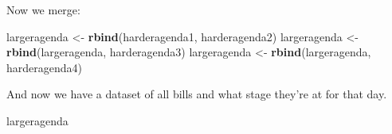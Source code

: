 \documentclass[]{book}
\newenvironment{Shaded}{\begin{snugshade}}{\end{snugshade}}
\newcommand{\CharTok}[1]{\textcolor[rgb]{0.31,0.60,0.02}{#1}}
\newcommand{\DataTypeTok}[1]{\textcolor[rgb]{0.13,0.29,0.53}{#1}}
\newcommand{\DecValTok}[1]{\textcolor[rgb]{0.00,0.00,0.81}{#1}}
\newcommand{\KeywordTok}[1]{\textcolor[rgb]{0.13,0.29,0.53}{\textbf{#1}}}
\newcommand{\NormalTok}[1]{#1}
\newcommand{\OperatorTok}[1]{\textcolor[rgb]{0.81,0.36,0.00}{\textbf{#1}}}
\newcommand{\StringTok}[1]{\textcolor[rgb]{0.31,0.60,0.02}{#1}}
\begin{document}
\begin{Shaded}
\end{Shaded}

Now we merge:

\begin{Shaded}
\begin{Highlighting}[]
\NormalTok{largeragenda <-}\StringTok{ }\KeywordTok{rbind}\NormalTok{(harderagenda1, harderagenda2)}
\NormalTok{largeragenda <-}\StringTok{ }\KeywordTok{rbind}\NormalTok{(largeragenda, harderagenda3)}
\NormalTok{largeragenda <-}\StringTok{ }\KeywordTok{rbind}\NormalTok{(largeragenda, harderagenda4)}
\end{Highlighting}
\end{Shaded}

And now we have a dataset of all bills and what stage they're at for that day.

\begin{Shaded}
\begin{Highlighting}[]
\NormalTok{largeragenda}
\end{Highlighting}
\end{Shaded}
\end{document}
